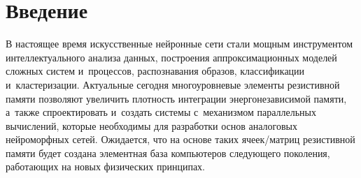      
 
\vspace*{-6pt}



\thispagestyle{headings}

\begin{multicols}{2}

\label{st\stat}
     
\section{Введение}

    В настоящее время искусственные нейронные сети стали мощным 
инструментом интеллектуального анализа данных, построения 
аппрок\-си\-ма\-ционных моделей сложных систем и~процессов, распознавания 
образов, классификации и~кластеризации. Актуальные сегодня многоуровневые 
элементы резистивной памяти позволяют увеличить плотность интеграции 
энергонезависимой памяти, а~также спроектировать и~создать системы 
с~механизмом параллельных вычислений, которые необходимы для разработки 
основ аналоговых нейроморфных сетей. Ожидается, что на основе таких 
яче\-ек/мат\-риц резистивной памяти будет создана элементная база компьютеров 
следующего поколения, работающих на новых физических прин\-ципах.
{

}
    
     \begin{table*}\small %
     \begin{center}


\end{center}
\end{table*}
\end{multicols}
